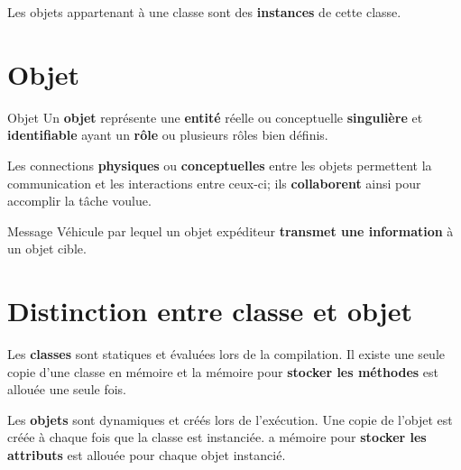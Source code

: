 \documentclass[16pt]{report}
\begin{document}
\begin{multicols*}{2}
            \begin{note}{}{}
                Les objets appartenant à une classe sont des \textbf{instances} de cette classe.   
            \end{note}
            
            \section{Objet}
            \begin{Definitionx}{Objet}{}
                Un \textbf{objet} représente une \textbf{entité} \textcolor{myb}{réelle} ou 
                \textcolor{myb}{conceptuelle} \textbf{singulière} et \textbf{identifiable} ayant 
                un \textbf{rôle} ou plusieurs rôles bien définis.   
            \end{Definitionx}

            \begin{note}{}{}
                Les connections \textbf{physiques} ou \textbf{conceptuelles} entre les objets permettent 
                la communication et les interactions entre ceux-ci; ils \textbf{collaborent} ainsi
                pour accomplir la tâche voulue. 
            \end{note}

            \begin{definition}{Message}{}
                Véhicule par lequel un objet expéditeur \textbf{transmet une information} 
                à un objet cible. 
            \end{definition}                    


            \section{Distinction entre classe et objet}

            Les \textbf{classes} sont \textcolor{myb}{statiques} et évaluées lors de la compilation. 
            Il existe \textcolor{myb}{une seule copie} d'une classe en mémoire et la mémoire 
            pour \textbf{stocker les méthodes} est allouée \textcolor{myb}{une seule fois}.     
            
            Les \textbf{objets} sont \textcolor{myb}{dynamiques} et créés lors de l'exécution. Une 
            copie de l'objet est créée à \textcolor{myb}{chaque fois} que la classe est instanciée.   
            a mémoire pour \textbf{stocker les attributs} est allouée \textcolor{myb}{pour chaque
            objet instancié}.     



\end{multicols*}
\end{document}
